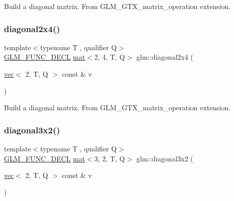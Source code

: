 Build a diagonal matrix. From G\+L\+M\+\_\+\+G\+T\+X\+\_\+matrix\+\_\+operation extension. \mbox{\label{group__gtx__matrix__operation_ga30b4dbfed60a919d66acc8a63bcdc549}} 
\subsubsection{\texorpdfstring{diagonal2x4()}{diagonal2x4()}}
{\footnotesize\ttfamily template$<$typename T , qualifier Q$>$ \\
\mbox{\hyperlink{setup_8hpp_ab2d052de21a70539923e9bcbf6e83a51}{G\+L\+M\+\_\+\+F\+U\+N\+C\+\_\+\+D\+E\+CL}} \mbox{\hyperlink{structglm_1_1mat}{mat}}$<$2, 4, T, Q$>$ glm\+::diagonal2x4 (\begin{DoxyParamCaption}\item[{\mbox{\hyperlink{structglm_1_1vec}{vec}}$<$ 2, T, Q $>$ const \&}]{v }\end{DoxyParamCaption})}

Build a diagonal matrix. From G\+L\+M\+\_\+\+G\+T\+X\+\_\+matrix\+\_\+operation extension. \mbox{\label{group__gtx__matrix__operation_ga832c805d5130d28ad76236958d15b47d}} 
\subsubsection{\texorpdfstring{diagonal3x2()}{diagonal3x2()}}
{\footnotesize\ttfamily template$<$typename T , qualifier Q$>$ \\
\mbox{\hyperlink{setup_8hpp_ab2d052de21a70539923e9bcbf6e83a51}{G\+L\+M\+\_\+\+F\+U\+N\+C\+\_\+\+D\+E\+CL}} \mbox{\hyperlink{structglm_1_1mat}{mat}}$<$3, 2, T, Q$>$ glm\+::diagonal3x2 (\begin{DoxyParamCaption}\item[{\mbox{\hyperlink{structglm_1_1vec}{vec}}$<$ 2, T, Q $>$ const \&}]{v }\end{DoxyParamCaption})}

